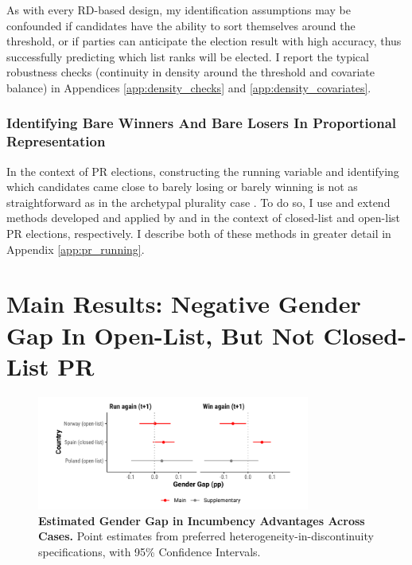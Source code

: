 \documentclass[12pt]{article}
\begin{document}
As with every RD-based design, my identification assumptions may be confounded if candidates have the ability to sort themselves around the threshold, or if parties can anticipate the election result with high accuracy, thus successfully predicting which list ranks will be elected. I report the typical robustness checks (continuity in density around the threshold and covariate balance) in Appendices \ref{app:density_checks} and  \ref{app:density_covariates}.

\subsubsection{Identifying Bare Winners And Bare Losers In Proportional Representation}

In the context of PR elections, constructing the running variable and identifying which candidates came close to barely losing or barely winning is not as straightforward as in the archetypal plurality case \citep{lee2001a,lee2008, fiva2016,fiva2018b}. To do so, I use and extend methods developed and applied by \citet{folke2014} and \citet{fiva2018a} in the context of closed-list and open-list PR elections, respectively. I describe both of these methods in greater detail in Appendix \ref{app:pr_running}.


\section{Main Results: Negative Gender Gap In Open-List, But Not Closed-List PR}

\begin{figure}[htbp]
    \centering
    \includegraphics[width = 0.8\textwidth]{../output/figures/coef_summary.pdf}
    \caption{\textbf{Estimated Gender Gap in Incumbency Advantages Across Cases.} Point estimates from preferred heterogeneity-in-discontinuity specifications, with 95\% Confidence Intervals.}
    \label{fig:coef_summary}
\end{figure}
\end{document}
